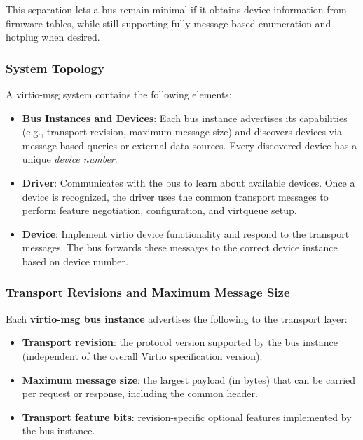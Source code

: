 This separation lets a bus remain minimal if it obtains device information from
firmware tables, while still supporting fully message-based enumeration and
hotplug when desired.

\subsubsection{System Topology}

A virtio-msg system contains the following elements:

\begin{itemize}
  \item \textbf{Bus Instances and Devices}: Each bus instance advertises its
        capabilities (e.g., transport revision, maximum message size) and
        discovers devices via message-based queries or external data sources.
        Every discovered device has a unique \emph{device number}.
  \item \textbf{Driver}: Communicates with the bus to learn about
        available devices. Once a device is recognized, the driver uses the
        common transport messages to perform feature negotiation, configuration,
        and virtqueue setup.
  \item \textbf{Device}: Implement virtio device functionality and
        respond to the transport messages. The bus forwards these messages to
        the correct device instance based on device number.
\end{itemize}

\subsubsection{Transport Revisions and Maximum Message Size}
\label{sec:Virtio Transport Options / Virtio Over Messages / Basic Concepts / Revisions}

Each \textbf{virtio-msg bus instance} advertises the following to the transport
layer:
\begin{itemize}
  \item \textbf{Transport revision}: the protocol version supported by the bus
        instance (independent of the overall Virtio specification version).
  \item \textbf{Maximum message size}: the largest payload (in bytes) that can
        be carried per request or response, including the common header.
  \item \textbf{Transport feature bits}: revision-specific optional features
        implemented by the bus instance.
\end{itemize}

